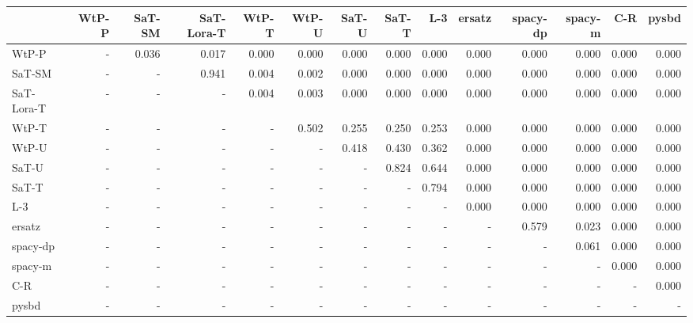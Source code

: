 \begin{tabular}{lrrrrrrrrrrrrr}
\toprule
 & WtP-P & SaT-SM & SaT-Lora-T & WtP-T & WtP-U & SaT-U & SaT-T & L-3 & ersatz & spacy-dp & spacy-m & C-R & pysbd \\
\midrule
WtP-P & - & 0.036 & 0.017 & 0.000 & 0.000 & 0.000 & 0.000 & 0.000 & 0.000 & 0.000 & 0.000 & 0.000 & 0.000 \\
SaT-SM & - & - & 0.941 & 0.004 & 0.002 & 0.000 & 0.000 & 0.000 & 0.000 & 0.000 & 0.000 & 0.000 & 0.000 \\
SaT-Lora-T & - & - & - & 0.004 & 0.003 & 0.000 & 0.000 & 0.000 & 0.000 & 0.000 & 0.000 & 0.000 & 0.000 \\
WtP-T & - & - & - & - & 0.502 & 0.255 & 0.250 & 0.253 & 0.000 & 0.000 & 0.000 & 0.000 & 0.000 \\
WtP-U & - & - & - & - & - & 0.418 & 0.430 & 0.362 & 0.000 & 0.000 & 0.000 & 0.000 & 0.000 \\
SaT-U & - & - & - & - & - & - & 0.824 & 0.644 & 0.000 & 0.000 & 0.000 & 0.000 & 0.000 \\
SaT-T & - & - & - & - & - & - & - & 0.794 & 0.000 & 0.000 & 0.000 & 0.000 & 0.000 \\
L-3 & - & - & - & - & - & - & - & - & 0.000 & 0.000 & 0.000 & 0.000 & 0.000 \\
ersatz & - & - & - & - & - & - & - & - & - & 0.579 & 0.023 & 0.000 & 0.000 \\
spacy-dp & - & - & - & - & - & - & - & - & - & - & 0.061 & 0.000 & 0.000 \\
spacy-m & - & - & - & - & - & - & - & - & - & - & - & 0.000 & 0.000 \\
C-R & - & - & - & - & - & - & - & - & - & - & - & - & 0.000 \\
pysbd & - & - & - & - & - & - & - & - & - & - & - & - & - \\
\bottomrule
\end{tabular}

